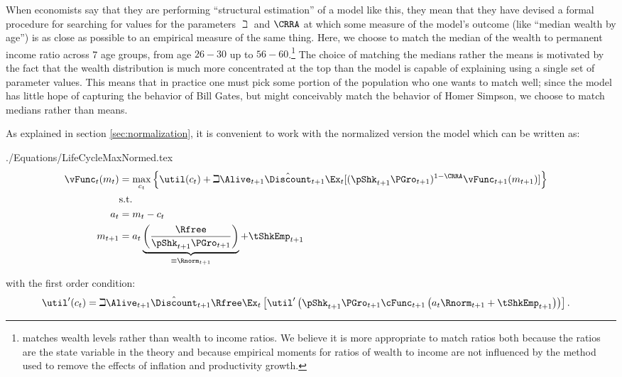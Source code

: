 \documentclass[titlepage]{\econtex}
\begin{document}
  When economists say that they are performing ``structural estimation''
  of a model like this, they mean that they have devised a
  formal procedure for searching for values for the parameters ${\beth}$
  and $\CRRA$ at which some measure of the model's outcome (like
  ``median wealth by age'') is as close as possible to an empirical measure
  of the same thing. Here, we choose to match the median of the
  wealth to permanent income ratio across 7 age groups, from age $26-30$
  up to $56-60$.\footnote{\cite{cagettiWprofiles}
    matches wealth levels rather than wealth to income ratios. We
    believe it is more appropriate to match ratios both because the
    ratios are the state variable in the theory and because empirical
    moments for ratios of wealth to income are not influenced by the
    method used to remove the effects of inflation and productivity
    growth.} The choice of matching the medians rather the means is
  motivated by the fact that the wealth distribution is much more
  concentrated at the top than the model is capable of explaining using a single
  set of parameter values.  This means that in practice one must pick
  some portion of the population who one wants to match well; since the
  model has little hope of capturing the behavior of Bill Gates, but
  might conceivably match the behavior of Homer Simpson, we choose to
  match medians rather than means.

  As explained in section \ref{sec:normalization}, it is convenient to work with the normalized version the model which can be written as:
  \begin{verbatimwrite}{./Equations/LifeCycleMaxNormed.tex}
    \begin{equation*}\begin{gathered}\begin{aligned}
      {\vFunc}_{t}({m}_{t})  & = \max_{{c}_{t}} \left\{\util({c}_{t})+\beth\Alive_{t+1}\hat{\Discount}_{t+1}
                                  \Ex_{t}[(\pShk_{t+1}\PGro_{t+1})^{1-\CRRA}{\vFunc}_{t+1}({m}_{t+1})] \right\}   \\
                            & \text{s.t.} &   \nonumber \\
      {a}_{t}    & = {m}_{t}-{c}_{t} \nonumber
      \\      {m}_{t+1}  & = {a}_{t}\underbrace{\left(\frac{\Rfree}{\pShk_{t+1}\PGro_{t+1}}\right)}_{\equiv \Rnorm_{t+1}}+\tShkEmp_{t+1}
    \end{aligned}\end{gathered}\end{equation*}
  \end{verbatimwrite}
  
  with the first order condition:
  \begin{equation}\begin{gathered}\begin{aligned}
    \util^{\prime}({c}_{t}) & = \beth\Alive_{t+1}\hat{\Discount}_{t+1}\Rfree \Ex_{t}\left[\util^{\prime}\left(\pShk_{t+1}\PGro_{t+1}\cFunc_{t+1}\left({a}_{t}\Rnorm_{t+1}+\tShkEmp_{t+1}\right)\right)\right]\label{eq:FOCLifeCycle}
                               .
  \end{aligned}\end{gathered}\end{equation}
\end{document}
